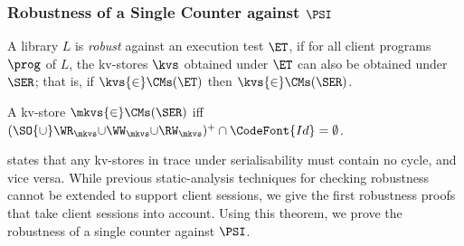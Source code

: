 

\subsubsection{Robustness of a Single Counter against $\PSI$}

A library $L$ is \emph{robust} against an execution test $\ET$,
if for all client programs \( \prog \) of $L$, 
the kv-stores \( \kvs \) obtained under $\ET$ can also be obtained under $\SER$;
that is, if \( \kvs {\in} \CMs(\ET) \) then \( \kvs {\in} \CMs(\SER) \).

\spaceshrink{-3pt}
\begin{theorem}
\label{thm:serialisable_nocycle}
A kv-store $\mkvs {\in} \CMs(\SER)$ iff $(\SO {\cup} \WR_{\mkvs} 
{\cup} \WW_{\mkvs} {\cup} \RW_{\mkvs})^{+} \cap \CodeFont{Id} = \emptyset$.%
\end{theorem}
\spaceshrink{-3pt}

 states that any kv-stores in trace under serialisability must contain no cycle, and vice versa.
While previous static-analysis techniques for checking robustness \citep{giovanni_concur16,SIanalysis,laws,sureshConcur}
cannot be extended to support client sessions, 
we give the first robustness proofs that take client sessions into account.
Using this theorem, we prove the robustness of a single counter against $\PSI$.

